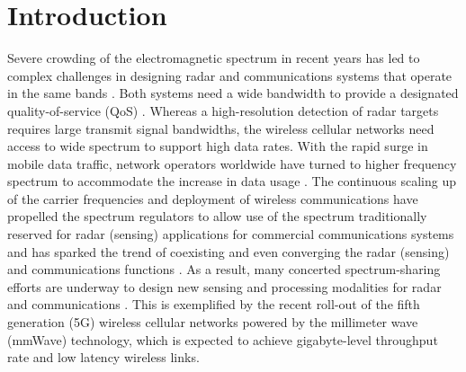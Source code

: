 \documentclass[10pt,journal]{IEEEtran}
\theoremstyle{definition}
\begin{document}
	\section{Introduction}
	\color{blue}Severe crowding of the electromagnetic spectrum in recent years has led to complex challenges in designing radar and communications systems that operate in the same bands \textcolor{red}{\cite{Petropulu2020dfrc,mishra2019toward,zheng2019overiview,liu2018toward}}. Both systems need a wide bandwidth to provide a designated quality-of-service (QoS) \cite{dokhanchi2019mmwave,biswas2018fdqos}. Whereas a high-resolution detection of radar targets requires large transmit signal bandwidths\cite{Eldar2020jointradarcomm}, 
	the wireless cellular networks need access to wide spectrum to support high data rates\cite{biswas2018fdqos,Lops2020uplink}. With the rapid surge in mobile data traffic, network operators worldwide have turned to higher frequency spectrum to accommodate the increase in data usage \cite{Petropulu2020dfrc,mishra2019toward,zheng2019overiview,liu2018toward}. The continuous scaling up of the carrier frequencies and deployment of wireless communications have propelled the spectrum regulators to allow use of the spectrum traditionally reserved for radar (sensing) applications for commercial communications systems and has sparked the trend of coexisting and even converging the radar (sensing) and communications functions \cite{zheng2019overiview}.
	As a result, many concerted spectrum-sharing efforts are underway to design new sensing and processing modalities for radar and communications \textcolor{red}{\cite{Petropulu2020dfrc,mishra2019toward,liu2018toward,Elsdar2020JRCjointbeamforming,JRCKoivunen2020hybridradarbf,Heath18802commradar,Lops2019interference}}. %
	\iffalse
	This is exemplified by the recent roll-out of the fifth generation (5G) wireless cellular networks powered by the millimeter wave (mmWave) technology, which is expected to achieve gigabyte-level throughput rate and low latency wireless links.  %
\end{document}
